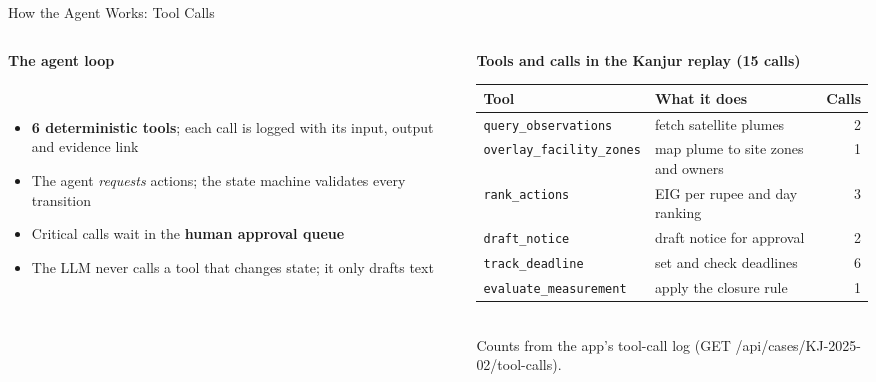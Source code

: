 \documentclass[aspectratio=169,10pt]{beamer}
\begin{document}
\begin{frame}[t]{How the Agent Works: Tool Calls}
\begin{columns}[T]
\begin{column}{0.5\textwidth}
{\small\bfseries The agent loop}\\[0.15cm]
\\[0.25cm]
\footnotesize
\begin{itemize}\setlength\itemsep{3pt}
\item \textbf{6 deterministic tools}; each call is logged with its input, output and evidence link
\item The agent \emph{requests} actions; the state machine validates every transition
\item Critical calls wait in the \textbf{human approval queue}
\item The LLM never calls a tool that changes state; it only drafts text
\end{itemize}
\end{column}
\begin{column}{0.47\textwidth}
{\small\bfseries Tools and calls in the Kanjur replay (15 calls)}\\[0.15cm]
\renewcommand{\arraystretch}{1.2}
\scriptsize
\begin{tabular}{@{}l >{\raggedright\arraybackslash}p{2.4cm} r@{}}
\toprule
Tool & What it does & Calls\\
\midrule
\texttt{query\_observations} & fetch satellite plumes & 2\\
\texttt{overlay\_facility\_zones} & map plume to site zones and owners & 1\\
\texttt{rank\_actions} & EIG per rupee and day ranking & 3\\
\texttt{draft\_notice} & draft notice for approval & 2\\
\texttt{track\_deadline} & set and check deadlines & 6\\
\texttt{evaluate\_measurement} & apply the closure rule & 1\\
\bottomrule
\end{tabular}\\[0.12cm]
{\tiny\color{slate}Counts from the app's tool-call log (GET /api/cases/KJ-2025-02/tool-calls).}
\end{column}
\end{columns}
\end{frame}
\end{document}
